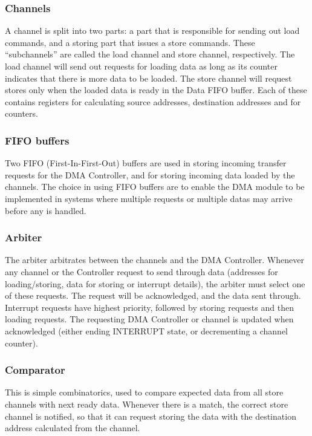 \subsubsection{Channels}
A channel is split into two parts: a part that is responsible for sending out load
commands, and a storing part that issues a store commands. These ``subchannels''
are called the load channel and store channel, respectively.
The load channel will send out requests for loading data as long as its counter indicates that there is more data to be loaded. The store channel will request stores only when the loaded data is ready in the Data FIFO buffer.
Each of these contains registers for calculating source addresses, destination addresses and for counters.

\subsubsection{FIFO buffers}
Two FIFO (First-In-First-Out) buffers are used in storing incoming transfer requests for the DMA Controller, and for storing incoming data loaded by the channels.
The choice in using FIFO buffers are to enable the DMA module to be implemented in systems where multiple requests or multiple datas may arrive before any is handled.

\subsubsection{Arbiter}
The arbiter arbitrates between the channels and the DMA Controller.
Whenever any channel or the Controller request to send through data (addresses for loading/storing, data for storing or interrupt details), the arbiter must select one of these requests.
The request will be acknowledged, and the data sent through.
Interrupt requests have highest priority, followed by storing requests and then loading requests.
The requesting DMA Controller or channel is updated when acknowledged (either ending INTERRUPT state, or decrementing a channel counter).

\subsubsection{Comparator}
This is simple combinatorics, used to compare expected data from all store channels with next ready data.
Whenever there is a match, the correct store channel is notified, so that it can request storing the data with the destination address calculated from the channel.


